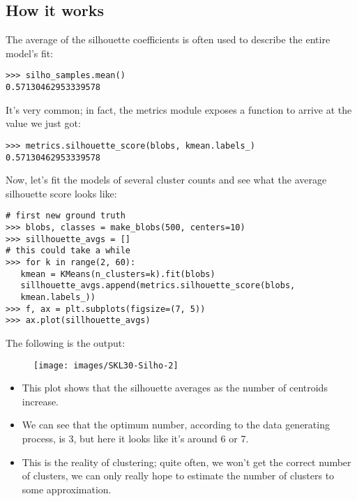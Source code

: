 \documentclass[SKL-MASTER.tex]{subfiles}
\begin{document}
\subsection*{How it works}
The average of the silhouette coefficients is often used to describe the entire model's fit:
\begin{framed}
\begin{verbatim}
>>> silho_samples.mean()
0.57130462953339578
\end{verbatim}
\end{framed}
It's very common; in fact, the metrics module exposes a function to arrive at the value we
just got:
\begin{framed}
\begin{verbatim}
>>> metrics.silhouette_score(blobs, kmean.labels_)
0.57130462953339578
\end{verbatim}
\end{framed}
Now, let's fit the models of several cluster counts and see what the average silhouette score
looks like:
\begin{framed}
\begin{verbatim}
# first new ground truth
>>> blobs, classes = make_blobs(500, centers=10)
>>> sillhouette_avgs = []
# this could take a while
>>> for k in range(2, 60):
   kmean = KMeans(n_clusters=k).fit(blobs)
   sillhouette_avgs.append(metrics.silhouette_score(blobs,
   kmean.labels_))
>>> f, ax = plt.subplots(figsize=(7, 5))
>>> ax.plot(sillhouette_avgs)
\end{verbatim}
\end{framed}

\newpage
The following is the output:
\begin{figure}[h!]
\centering
\texttt{[image: images/SKL30-Silho-2]}
\end{figure}

\begin{itemize}
\item This plot shows that the silhouette averages as the number of centroids increase.
\item  We can see
that the optimum number, according to the data generating process, is 3, but here it looks like
it's around 6 or 7. 
\item This is the reality of clustering; quite often, we won't get the correct number
of clusters, we can only really hope to estimate the number of clusters to some approximation.
\end{itemize}
\end{document}
